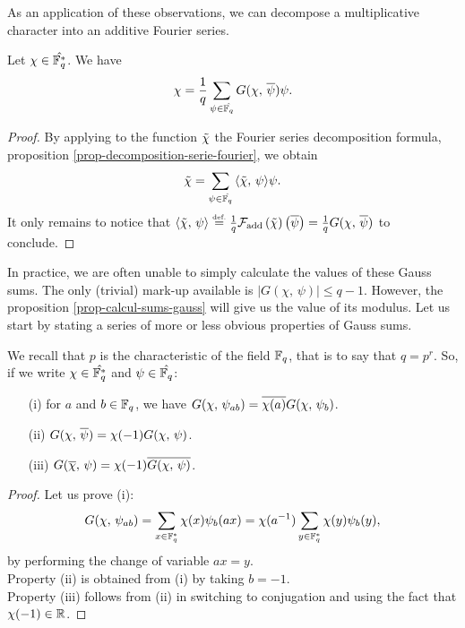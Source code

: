  
As an application of these observations, we can decompose a multiplicative character into an additive Fourier series.
 
\begin{prop}
Let $ \chi \in \hat{\mathbb{F}_q^*} $. We have
\begin{equation*}
\chi = \frac{1}{q} \sum_{\psi \in \hat{\mathbb{F}_q}}{G (\chi, \, \overline{\psi}) \psi}.
\end{equation*}
\end{prop}
 
\begin{proof}
By applying to the function $ \tilde{\chi} $ the Fourier series decomposition formula, proposition \ref{prop-decomposition-serie-fourier}, we obtain
\begin{equation*}
\tilde{\chi} = \sum_{\psi \in \hat{\mathbb{F}_q}}{\langle \tilde{\chi},\,\psi\rangle \psi}.
\end{equation*}
It only remains to notice that $ \langle \tilde{\chi},\,\psi\rangle \stackrel{\mbox{\upshape\tiny def.}}{=} \frac{1}{q} \mathcal{F}_{\text{add}} \left(\tilde{\chi} \right) \left(\overline{\psi} \right) = \frac{1}{q} G (\chi, \, \overline{\psi}) $ to conclude.
\end{proof}
 
 
In practice, we are often unable to simply calculate the values of these Gauss sums. The only (trivial) mark-up available is $ | G (\chi, \, \psi) | \leq q-1 $. However, the proposition \ref{prop-calcul-sums-gauss} will give us the value of its modulus. Let us start by stating a series of more or less obvious properties of Gauss sums.
 
\begin{prop}
\label{prop-ptes-are-gauss}
We recall that $ p $ is the characteristic of the field $ \mathbb{F}_q $, that is to say that $ q = p^r $. So, if we write $ \chi \in \hat{\mathbb{F}_q^*} $ and $ \psi \in \hat{\mathbb{F}_q} $: \begin{itemize}
\item [{\upshape (i)}] for $ a $ and $ b \in \mathbb{F}_q $, we have $ G (\chi, \, \psi_{ab}) = \overline{\chi (a)} G (\chi, \, \psi_b) $.
\item [{\upshape (ii)}] $ G (\chi, \, \overline{\psi}) = \chi (-1) G (\chi, \, \psi) $.
\item [{\upshape (iii)}] $ G (\overline{\chi}, \, \psi) = \chi (-1) \overline{G (\chi, \, \psi)} $.
\end{itemize}
\end{prop}
\begin{proof}
Let us prove (i):
\begin{equation*}
G (\chi, \, \psi_{ab}) = \sum_{x \in \mathbb{F}_q^*}{\chi (x) \psi_b (ax)} = \chi (a^{-1}) \sum_{y \in \mathbb{F}_q^*}{\chi (y) \psi_b (y)},
\end{equation*}
by performing the change of variable $ ax = y $. \\Property (ii) is obtained from (i) by taking $ b = -1 $. \\Property (iii) follows from (ii) in switching to conjugation and using the fact that $ \chi (-1) \in \mathbb{R} $.
\end{proof}
 
